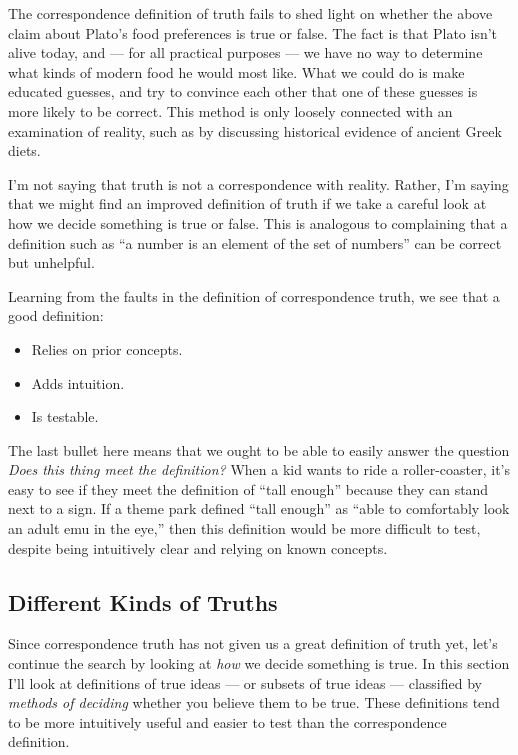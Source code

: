 \documentclass[11pt, oneside]{article}
\theoremstyle{argtstyle}
\begin{document}
The correspondence definition of truth fails to shed light
on whether the above claim about Plato's food preferences
is true or false.
The fact is that Plato isn't alive today, and --- for all practical purposes
--- we have no way to determine what kinds of modern food he would most like.
What we could do is make educated guesses, and try to convince each other
that one of these guesses is more likely to be correct.
This method is only loosely connected with an examination of reality, such as by
discussing historical evidence of ancient Greek diets.

I'm not saying that truth is not a correspondence
with reality.
Rather, I'm saying that we might find an improved definition of truth if we take
a careful look at how we decide something is true or false.
This is analogous to complaining that a definition such as ``a number is an
element of the set of numbers'' can be correct but unhelpful.

Learning from the faults in the definition of correspondence truth,
we see that a good definition:
\begin{itemize}
    \item Relies on prior concepts.
    \item Adds intuition.
    \item Is testable.
\end{itemize}

The last bullet here means that
we ought to be able to easily
answer the question {\em Does this thing
meet the definition?}
When a kid wants to ride a roller-coaster,
it's easy to see if they meet the definition
of ``tall enough'' because they can stand
next to a sign. If a theme park defined
``tall enough'' as ``able to comfortably
look an adult emu in the eye,'' then this
definition would be more difficult to test,
despite being intuitively clear and
relying on known concepts.


\subsection{Different Kinds of Truths}

Since correspondence truth has not given
us a great definition of truth yet, let's
continue the search by looking at {\em how}
we decide something is true.
In this section I'll look at definitions
of true ideas ---
or subsets of true ideas ---
classified by {\em methods of deciding}
whether you
believe them to be true.
These definitions tend to be more intuitively useful and easier to
test than the correspondence definition.
\end{document}
